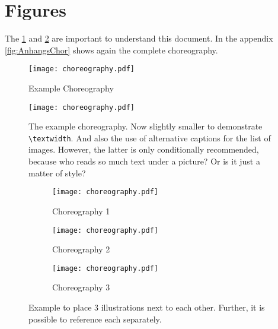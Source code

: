 \section{Figures}
The \cref{fig:chor1} and \ref{fig:chor2} are important to understand this document.
In the appendix \vref{fig:AnhangsChor} shows again the complete choreography.

\begin{figure}
  \centering
  \texttt{[image: choreography.pdf]}
  \caption{Example Choreography}
  \label{fig:chor1}
\end{figure}

\begin{figure}
  \centering
  \texttt{[image: choreography.pdf]}
  \caption[Example Choreography]{The example choreography. Now slightly smaller to demonstrate \texttt{\textbackslash textwidth}. And also the use of alternative captions for the list of images. However, the latter is only conditionally recommended, because who reads so much text under a picture? Or is it just a matter of style?}
  \label{fig:chor2}
\end{figure}


\begin{figure}
  \hfill
  \begin{subfigure}{.3\textwidth}
    \texttt{[image: choreography.pdf]}
    \caption{Choreography 1}
    \label{fig:subfigA}
  \end{subfigure}
  \hfill
  \begin{subfigure}{.3\textwidth}
    \texttt{[image: choreography.pdf]}
    \caption{Choreography 2}
    \label{fig:subfigB}
  \end{subfigure}
  \hfill
  \begin{subfigure}{.3\textwidth}
    \texttt{[image: choreography.pdf]}
    \caption{Choreography 3}
    \label{fig:subfigC}
  \end{subfigure}
  \caption{Example to place 3 illustrations next to each other. Further, it is possible to reference each separately.}
  \label{fig:subfig_example}
\end{figure}

